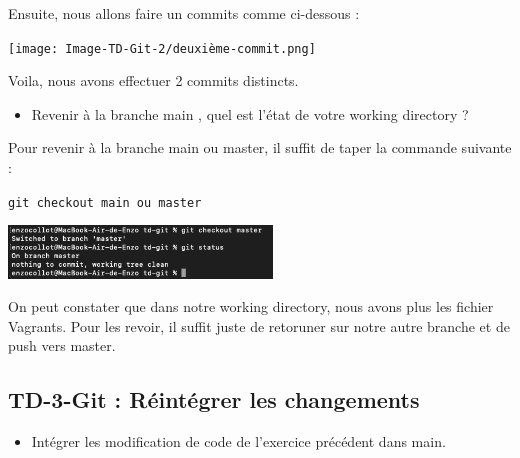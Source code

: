 \documentclass[12pt]{article}
\begin{document}
\vspace{0.3cm}

Ensuite, nous allons faire un commits comme ci-dessous : 

\vspace{0.3cm}

\begin{center}
  \texttt{[image: Image-TD-Git-2/deuxième-commit.png]}
\end{center}

\vspace{0.3cm}

Voila, nous avons effectuer 2 commits distincts.

\vspace{0.3cm}

\begin{itemize}
  \item Revenir à la branche main , quel est l'état de votre working directory ?
\end{itemize}

\vspace{0.3cm}

Pour revenir à la branche main ou master, il suffit de taper la commande suivante : 

\texttt{git checkout main ou master}

\vspace{0.3cm}

\begin{center}
  \includegraphics[width=7cm]{Image-TD-Git-2/git-checkout-master.png}
\end{center}

\vspace{0.3cm}

On peut constater que dans notre working directory, nous avons plus les fichier Vagrants. Pour les revoir, il suffit juste de retoruner sur notre autre branche et de push vers master.


\newpage

\subsection{TD-3-Git : Réintégrer les changements}

\vspace{0.3cm}

\begin{itemize}
  \item Intégrer les modification de code de l'exercice précédent dans main.
\end{itemize}
\end{document}
